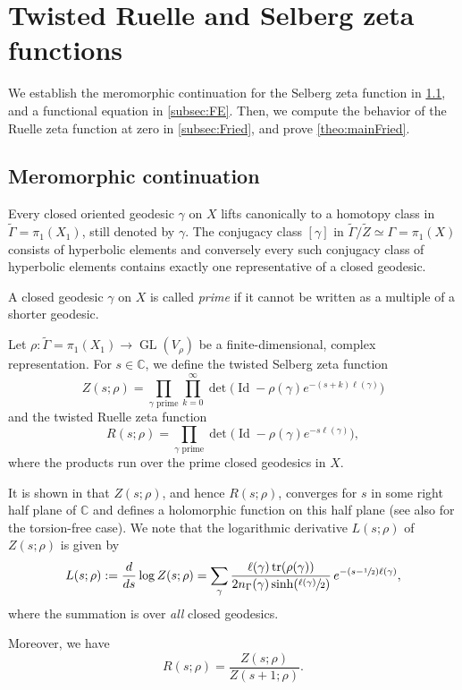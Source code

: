 \documentclass[10pt]{amsart}
\theoremstyle{plain}
\theoremstyle{definition}
\theoremstyle{remark}
\newcommand{\C}{\mathbb{C}}
\DeclareMathOperator{\GL}{GL}
\DeclareMathOperator{\tr}{tr}
\DeclareMathOperator{\Id}{Id}
\numberwithin{equation}{section}
\begin{document}
\section{Twisted Ruelle and Selberg zeta functions}
\label{sec:Ruelle}
We establish the meromorphic continuation for the Selberg zeta function in \cref{subsec:mero}, and a functional equation in \cref{subsec:FE}. Then, we compute the behavior of the Ruelle zeta function at zero in \cref{subsec:Fried}, and prove \cref{theo:mainFried}.

\subsection{Meromorphic continuation}
\label{subsec:mero}

Every closed oriented geodesic $\gamma$ on $X$ lifts canonically to a homotopy class in $\widetilde{\Gamma}=\pi_1(X_1)$, still denoted by $\gamma$. The conjugacy class $[\gamma]$ in $\widetilde{\Gamma}/\widetilde{Z}\simeq\Gamma=\pi_1(X)$ consists of hyperbolic elements and conversely every such conjugacy class of hyperbolic elements contains exactly one representative of a closed geodesic.

A closed geodesic $\gamma$ on $X$ is called \emph{prime} if it cannot be written as a multiple of a shorter geodesic.

Let $\rho:\widetilde{\Gamma}=\pi_1(X_1)\to\GL(V_\rho)$ be a finite-dimensional, complex representation. For $s\in\C$, we define the twisted Selberg zeta function
\[
Z(s;\rho) = \prod_{\gamma\text{ prime}}\prod_{k=0}^\infty\det\bigl(\Id-\rho(\gamma)e^{-(s+k)\ell(\gamma)}\bigr)
\]
and the twisted Ruelle zeta function
\[
R(s;\rho) = \prod_{\gamma\text{ prime}}\det\bigl(\Id-\rho(\gamma)e^{-s\ell(\gamma)}\bigr),
\]
where the products run over the prime closed geodesics in $X$.

It is shown in \cite[Th.\,3.1]{fedosova2020meromorphic} that $Z(s;\rho)$, and hence $R(s;\rho)$, converges for $s$ in some right half plane of $\C$ and defines a holomorphic function on this half plane (see also \cite[\S 1.2]{Wo} for the torsion-free case). We note that the logarithmic derivative
$L(s;\rho)$ of $Z(s;\rho)$ is given by
\[
L(s;\rho):= \frac{d}{ds}\log Z(s;\rho) = \sum_\gamma\frac{\ell(\gamma)\tr(\rho(\gamma))}{2n_\Gamma(\gamma)\sinh(\sfrac{\ell(\gamma)}{2})}\,e^{-(s-\sfrac{1}{2})\ell(\gamma)},
\]
where the summation is over \emph{all} closed geodesics.

Moreover, we have
\begin{equation}
\label{eq:RuelSel} R(s;\rho) = \frac{Z(s;\rho)}{Z(s+1;\rho)}.
\end{equation}
\end{document}
